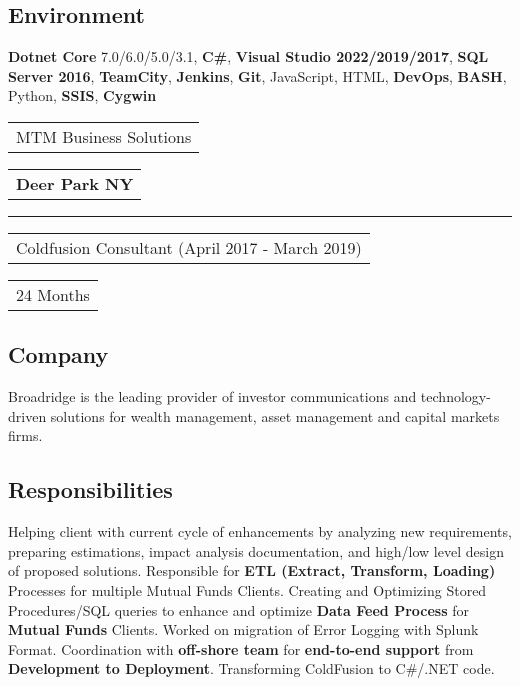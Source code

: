 \documentclass[letterpaper,11pt]{article}
\begin{document}
    \subsection{Environment}
    \textbf{\color{darkgray}Dotnet Core} 7.0/6.0/5.0/3.1, \textbf{\color{darkgray}C\#}, \textbf{\color{darkgray}Visual Studio 2022/2019/2017}, \textbf{\color{darkgray}SQL Server 2016}, \textbf{\color{darkgray}TeamCity}, \textbf{\color{darkgray}Jenkins}, \textbf{\color{darkgray}Git}, JavaScript, HTML, \textbf{\color{darkgray}DevOps}, \textbf{\color{darkgray}BASH}, Python, \textbf{\color{darkgray}SSIS}, \textbf{\color{darkgray}Cygwin}


    \pagebreak
    \noindent
    \begin{tabular}[t]{@{}l}
    \Large{MTM Business Solutions}
    \end{tabular}
    \hfill
    \begin{tabular}[t]{l@{}}
    \textbf{Deer Park NY}
    \end{tabular}
    \noindent\rule{\textwidth}{0.5pt}
    \begin{tabular}[t]{@{}l}
    Coldfusion Consultant (April 2017 - March 2019)
    \end{tabular}
    \hfill
    \begin{tabular}[t]{l@{}}
    24 Months
    \end{tabular}

    \subsection{Company}
    Broadridge is the leading provider of investor communications and technology-driven solutions for wealth management, asset management and capital markets firms.

    \subsection{Responsibilities}
    Helping client with current cycle of enhancements by analyzing new requirements, preparing estimations, impact analysis documentation, and high/low level design of proposed solutions. Responsible for \textbf{ETL (Extract, Transform, Loading)} Processes for multiple Mutual Funds Clients. Creating and Optimizing Stored Procedures/SQL queries to enhance and optimize \textbf{Data Feed Process} for \textbf{Mutual Funds} Clients. Worked on migration of Error Logging with Splunk Format. Coordination with \textbf{off-shore team} for \textbf{end-to-end support} from \textbf{Development to Deployment}. Transforming ColdFusion to C\#/.NET code.
\end{document}
